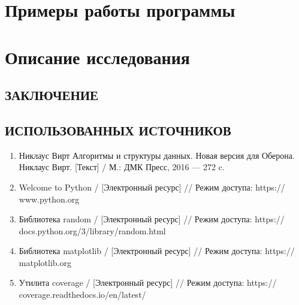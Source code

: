 \documentclass{article}
\begin{document}
\clearpage\section{Примеры работы программы}


\clearpage\section{Описание исследования}


\clearpage\begin{center}\section*{ЗАКЛЮЧЕНИЕ}\end{center}

\clearpage\begin{center}\section*{ ИСПОЛЬЗОВАННЫХ ИСТОЧНИКОВ}\end{center}
\begin{enumerate}
	\item Никлаус Вирт Алгоритмы и структуры данных. Новая версия для Оберона. Никлаус Вирт. [Текст] / М.: ДМК Пресс, 2016 
— 272 c.
	\item Welcome to Python / [Электронный ресурс] // Режим доступа: https://\\www.python.org
	\item	Библиотека random / [Электронный ресурс] // Режим доступа: https://\\docs.python.org/3/library/random.html
	\item	Библиотека matplotlib / [Электронный ресурс] // Режим доступа: https://\\matplotlib.org
	\item Утилита coverage / [Электронный ресурс] // Режим доступа: https://\\coverage.readthedocs.io/en/latest/
\end{enumerate}
\end{document}

